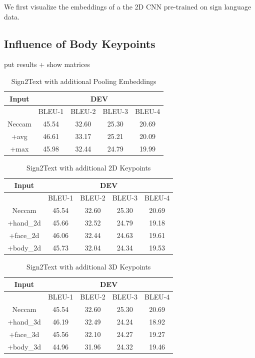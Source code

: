 \documentclass[final]{cvpr}
\begin{document}
We first visualize the embeddings of a the 2D CNN pre-trained on sign language data.
\subsection{Influence of Body Keypoints}
put results + show matrices\\
\begin{table}[h]
\centering
\begin{tabular}{*5c}
	\toprule
	Input &  \multicolumn{4}{c}{DEV}\\
	\midrule
	{}   & BLEU-1   & BLEU-2    & BLEU-3   & BLEU-4\\
	Neccam   &  45.54 & 32.60  & 25.30  & 20.69\\
	+avg   &  46.61 & 33.17   & 25.21  & 20.09\\
	+max   &  45.98  &  32.44   & 24.79  & 19.99\\
	\bottomrule
\end{tabular}
\caption{Sign2Text with additional Pooling Embeddings}
\end{table}

\begin{table}[h]
	\centering
	\begin{tabular}{*5c}
		\toprule
		Input &  \multicolumn{4}{c}{DEV}\\
		\midrule
		{}   & BLEU-1   & BLEU-2    & BLEU-3   & BLEU-4\\
		Neccam   &  45.54 & 32.60  & 25.30  & 20.69\\
		+hand\_2d   &  45.66 & 32.52   & 24.79  & 19.18\\
		+face\_2d   &  46.06  &  32.44   & 24.63  & 19.61\\
		+body\_2d   &  45.73 &  32.04   & 24.34  & 19.53\\	
		\bottomrule
	\end{tabular}
	\caption{Sign2Text with additional 2D Keypoints}
\end{table}

\begin{table}[h]
	\centering
	\begin{tabular}{*5c}
		\toprule
		Input &  \multicolumn{4}{c}{DEV}\\
		\midrule
		{}   & BLEU-1   & BLEU-2    & BLEU-3   & BLEU-4\\
		Neccam   &  45.54 & 32.60  & 25.30  & 20.69\\
		+hand\_3d   &  46.19 & 32.49   & 24.24  & 18.92\\
		+face\_3d   &  45.56  &  32.10 & 24.27  & 19.27\\
		+body\_3d   &  44.96 &  31.96   & 24.32  & 19.46\\	
		\bottomrule
	\end{tabular}
	\caption{Sign2Text with additional 3D Keypoints}
\end{table}
\end{document}
